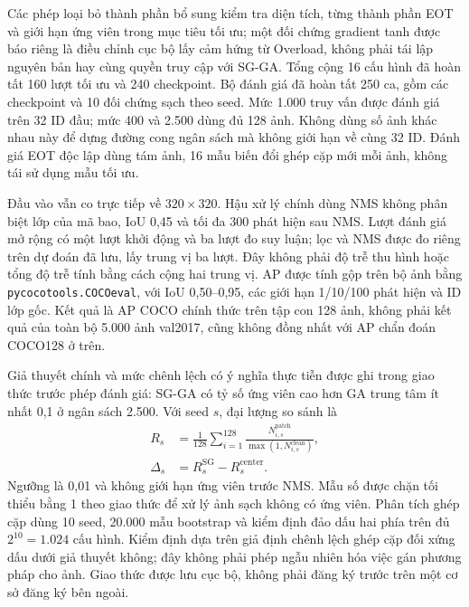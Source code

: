 \documentclass[a4paper,fleqn]{cas-dc}
\begin{document}
Các phép loại bỏ thành phần bổ sung kiểm tra diện tích, từng thành phần EOT và giới hạn ứng viên trong mục tiêu tối ưu; một đối chứng gradient tanh được báo riêng là điều chỉnh cục bộ lấy cảm hứng từ Overload, không phải tái lập nguyên bản hay cùng quyền truy cập với SG-GA. Tổng cộng 16 cấu hình đã hoàn tất 160 lượt tối ưu và 240 checkpoint. Bộ đánh giá đã hoàn tất 250 ca, gồm các checkpoint và 10 đối chứng sạch theo seed. Mức 1.000 truy vấn được đánh giá trên 32 ID đầu; mức 400 và 2.500 dùng đủ 128 ảnh. Không dùng số ảnh khác nhau này để dựng đường cong ngân sách mà không giới hạn về cùng 32 ID. Đánh giá EOT độc lập dùng tám ảnh, 16 mẫu biến đổi ghép cặp mới mỗi ảnh, không tái sử dụng mẫu tối ưu.

Đầu vào vẫn co trực tiếp về $320\times320$. Hậu xử lý chính dùng NMS không phân biệt lớp của mã bao, IoU 0,45 và tối đa 300 phát hiện sau NMS. Lượt đánh giá mở rộng có một lượt khởi động và ba lượt đo suy luận; lọc và NMS được đo riêng trên dự đoán đã lưu, lấy trung vị ba lượt. Đây không phải độ trễ thu hình hoặc tổng độ trễ tính bằng cách cộng hai trung vị. AP được tính gộp trên bộ ảnh bằng \texttt{pycocotools.COCOeval}, với IoU 0,50--0,95, các giới hạn 1/10/100 phát hiện và ID lớp gốc. Kết quả là AP COCO chính thức trên tập con 128 ảnh, không phải kết quả của toàn bộ 5.000 ảnh val2017, cũng không đồng nhất với AP chẩn đoán COCO128 ở trên.

Giả thuyết chính và mức chênh lệch có ý nghĩa thực tiễn được ghi trong giao thức trước phép đánh giá: SG-GA có tỷ số ứng viên cao hơn GA trung tâm ít nhất 0,1 ở ngân sách 2.500. Với seed $s$, đại lượng so sánh là
\[
\begin{aligned}
R_s&=\frac{1}{128}\sum_{i=1}^{128}\frac{N^{\mathrm{patch}}_{i,s}}{\max(1,N^{\mathrm{clean}}_{i,s})},\\
\Delta_s&=R_s^{\mathrm{SG}}-R_s^{\mathrm{center}}.
\end{aligned}
\]
Ngưỡng là 0,01 và không giới hạn ứng viên trước NMS. Mẫu số được chặn tối thiểu bằng 1 theo giao thức để xử lý ảnh sạch không có ứng viên. Phân tích ghép cặp dùng 10 seed, 20.000 mẫu bootstrap và kiểm định đảo dấu hai phía trên đủ $2^{10}=1.024$ cấu hình. Kiểm định dựa trên giả định chênh lệch ghép cặp đối xứng dấu dưới giả thuyết không; đây không phải phép ngẫu nhiên hóa việc gán phương pháp cho ảnh. Giao thức được lưu cục bộ, không phải đăng ký trước trên một cơ sở đăng ký bên ngoài.
\end{document}
